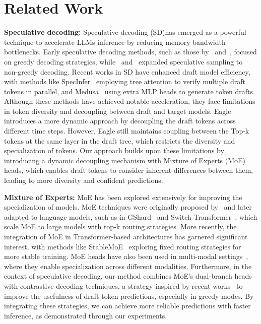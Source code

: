 \section{Related Work}
{\bf Speculative decoding:}
Speculative decoding (SD)has emerged as a powerful technique to accelerate LLMs inference by reducing memory bandwidth bottlenecks. Early speculative decoding methods, such as those by~\cite{stern2018blockwise} and~\cite{sun2021instantaneous}, focused on greedy decoding strategies, while~\cite{leviathan2023fast} and~\cite{chen2023accelerating} expanded speculative sampling to non-greedy decoding. Recent works in SD have enhanced draft model efficiency, with methods like SpecInfer~\cite{miao2023specinfer} employing tree attention to verify multiple draft tokens in parallel, and Medusa~\cite{cai2024medusa} using extra MLP heads to generate token drafts. Although these methods have achieved notable acceleration, they face limitations in token diversity and decoupling between draft and target models. Eagle~\cite{li2024eagle} introduces a more dynamic approach by decoupling the draft tokens across different time steps. However, Eagle still maintains coupling between the Top-k tokens at the same layer in the draft tree, which restricts the diversity and specialization of tokens. Our approach builds upon these limitations by introducing a dynamic decoupling mechanism with Mixture of Experts (MoE) heads, which enables draft tokens to consider inherent differences between them, leading to more diversity and confident predictions.

{\bf Mixture of Experts:}
MoE has been explored extensively for improving the specialization of models. MoE techniques were originally proposed by~\cite{ori_moe1, ori_moe2} and later adapted to language models, such as in GShard~\cite{gshard} and Switch Transformer~\cite{switch}, which scale MoE to large models with top-k routing strategies. More recently, the integration of MoE in Transformer-based architectures has garnered significant interest, with methods like StableMoE~\cite{stablemoe} exploring fixed routing strategies for more stable training. MoE heads have also been used in multi-modal settings~\cite{glam,openmoe}, where they enable specialization across different modalities. Furthermore, in the context of speculative decoding, our method combines MoE's dual-branch heads with contrastive decoding techniques, a strategy inspired by recent works~\cite{moe,stablemoe} to improve the usefulness of draft token predictions, especially in greedy modes. By integrating these strategies, we can achieve more reliable predictions with faster inference, as demonstrated through our experiments.

